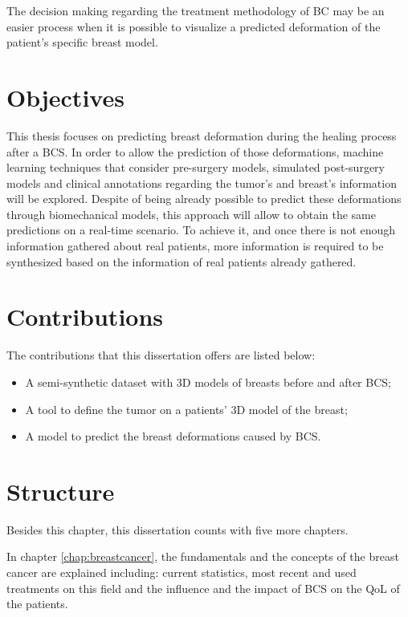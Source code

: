 The decision making regarding the treatment methodology of BC may be an easier process when it is possible to visualize a predicted deformation of the patient's specific breast model.

\section{Objectives} \label{sec:objectives}

This thesis focuses on predicting breast deformation during the healing process after a BCS. In order to allow the prediction of those deformations, machine learning techniques that consider pre-surgery models, simulated post-surgery models and clinical annotations regarding the tumor's and breast's information will be explored. Despite of being already possible to predict these deformations through biomechanical models, this approach will allow to obtain the same predictions on a real-time scenario. To achieve it, and once there is not enough information gathered about real patients, more information is required to be synthesized based on the information of real patients already gathered.


\section{Contributions} \label{sec:contrib}

The contributions that this dissertation offers are listed below:

\begin{itemize}
\item A semi-synthetic dataset with 3D models of breasts before and after BCS;
\item A tool to define the tumor on a patients' 3D model of the breast;
\item A model to predict the breast deformations caused by BCS.
\end{itemize}

\section{Structure} \label{sec:struct}

Besides this chapter, this dissertation counts with five more chapters.

In chapter \ref{chap:breastcancer}, the fundamentals and the concepts of the breast cancer are explained including: current statistics, most recent and used treatments on this field and the influence and the impact of BCS on the QoL of the patients.

